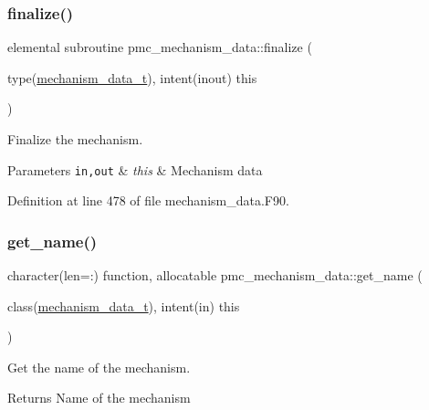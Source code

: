 \subsubsection{\texorpdfstring{finalize()}{finalize()}}
{\footnotesize\ttfamily elemental subroutine pmc\+\_\+mechanism\+\_\+data\+::finalize (\begin{DoxyParamCaption}\item[{type(\mbox{\hyperlink{structpmc__mechanism__data_1_1mechanism__data__t}{mechanism\+\_\+data\+\_\+t}}), intent(inout)}]{this }\end{DoxyParamCaption})\hspace{0.3cm}{\ttfamily [private]}}



Finalize the mechanism. 


\begin{DoxyParams}[1]{Parameters}
\mbox{\tt in,out}  & {\em this} & Mechanism data \\
\hline
\end{DoxyParams}


Definition at line 478 of file mechanism\+\_\+data.\+F90.

\mbox{\label{namespacepmc__mechanism__data_a181513498181e44bd8e3d9cc4aa648e7}} 
\subsubsection{\texorpdfstring{get\+\_\+name()}{get\_name()}}
{\footnotesize\ttfamily character(len=\+:) function, allocatable pmc\+\_\+mechanism\+\_\+data\+::get\+\_\+name (\begin{DoxyParamCaption}\item[{class(\mbox{\hyperlink{structpmc__mechanism__data_1_1mechanism__data__t}{mechanism\+\_\+data\+\_\+t}}), intent(in)}]{this }\end{DoxyParamCaption})\hspace{0.3cm}{\ttfamily [private]}}



Get the name of the mechanism. 

\begin{DoxyReturn}{Returns}
Name of the mechanism
\end{DoxyReturn}

